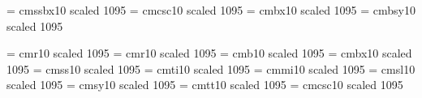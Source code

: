 \newskip\ttglue
\def\twelvepoint{\def\pointsize{twelve}%
  \def\rm{\fam0\twelverm}%
  \textfont0=\twelverm \scriptfont0=\tenrm \scriptscriptfont0=\sevenrm
  \textfont1=\twelvei \scriptfont1=\teni \scriptscriptfont1=\seveni
  \textfont2=\twelvesy \scriptfont2=\tensy \scriptscriptfont2=\sevensy
  \textfont3=\twelveex \scriptfont3=\twelveex \scriptscriptfont3=\twelveex
  \def\it{\fam\itfam\twelveit}%
  \textfont\itfam=\twelveit
  \def\sl{\fam\slfam\twelvesl}%
  \textfont\slfam=\twelvesl
  \def\bf{\fam\bffam\twelvebfxsca}%
  \textfont\bffam=\twelvebfxsca \scriptfont\bffam=\tenbf
   \scriptscriptfont\bffam=\sevenbfx
  \def\tt{\fam\ttfam\twelvett}%
  \textfont\ttfam=\twelvett \scriptfont\ttfam=\tentt
  \tt \ttglue=.5em plus .25em minus .15em
  \normalbaselines\rm %
  \setstrut
  \ifd@ocsty \def\documentpointsize{twelve}%
              \let\footerfont =\twelveit
              \let\headerfont=\twelveit 
              \let\footnotefont = \tenpoint
              \let\smallerfont = \tenpoint
              \let\cheadfont = \twentyonermsca
              \let\sheadfont=\fourteenbfxsca
              \let\ssheadfont=\twelvebfxsca
              \let\sssheadfont=\twelvebfxsca
              \let\dsssheadfont=\twelvebfxsca
              \let\captionnumfont=\twelvebfxsca
              \let\captiontitlefont=\relax
              \let\captionbodyfont=\relax
              \let\eqnumfont=\rm
              \setspacings\fi
  \let\bigfont = \fourteenrmsca
  \let\biggfont = \eighteenrmsca
  \let\bigggfont = \twentyonermsca 
  \let\titlefont = \bigggfont
  \let\sc=\tenrm
  }



\font\elevenssb = cmssbx10 scaled 1095  %
\font\elevencsc = cmcsc10 scaled 1095 %
\font\elevenbfx = cmbx10 scaled 1095 %
\font\elevenbfy = cmbsy10 scaled 1095 %

\font\elevenrm= cmr10 scaled 1095
\font\elevenrmsca = cmr10 scaled 1095
\font\elevenbf = cmb10 scaled 1095
\font\elevenbfxsca = cmbx10 scaled 1095
\font\elevenss = cmss10 scaled 1095 
\font\elevenit = cmti10 scaled 1095
\font\eleveni = cmmi10 scaled 1095
\font\elevensl = cmsl10 scaled 1095
\font\elevensy = cmsy10 scaled 1095
\font\eleventt = cmtt10 scaled 1095
\font\elevensc = cmcsc10 scaled 1095
\let\sanss = \elevenss

\let\elevenex=\tenex


